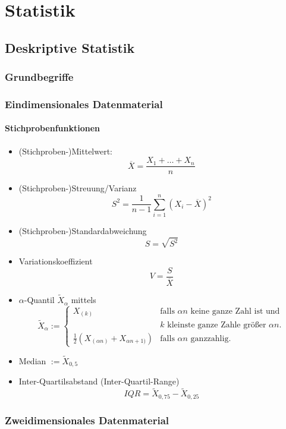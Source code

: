\chapter{Statistik}
\section{Deskriptive Statistik}
\subsection{Grundbegriffe}

\subsection{Eindimensionales Datenmaterial}

\subsubsection{Stichprobenfunktionen}
\begin{itemize}
\item (Stichproben-)Mittelwert:
$$\overline{X}=\frac{X_1+\ldots + X_n}{n}$$
\item (Stichproben-)Streuung/Varianz
$$S^2=\frac{1}{n-1} \sum_{i=1}^n (X_i - \overline{X})^2$$
\item (Stichproben-)Standardabweichung
$$S=\sqrt{S^2}$$
\item Variationskoeffizient
$$V=\frac{S}{\overline{X}}$$
\item $\alpha$-Quantil $\widetilde{X}_\alpha$ mittels
$$\widetilde{X}_\alpha := \begin{cases}
X_{(k)} & \text{falls }\alpha n\text{ keine ganze Zahl ist und }\\
& k\text{ kleinste ganze Zahle größer }\alpha n\text{.}\\
\frac{1}{2}(X_{(\alpha n)}+X_{\alpha n+1)}) & \text{falls }\alpha n\text{ ganzzahlig.}
\end{cases}$$
\item Median $:=\widetilde{X}_{0,5}$
\item Inter-Quartilsabstand (Inter-Quartil-Range)
$$IQR = \widetilde{X}_{0,75}-\widetilde{X}_{0,25}$$
\end{itemize}

\subsection{Zweidimensionales Datenmaterial}

